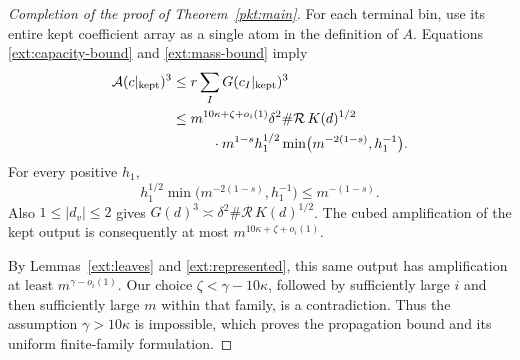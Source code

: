 \begin{proof}[Completion of the proof of Theorem~\ref{pkt:main}]
For each terminal bin, use its entire kept coefficient array
as a single atom in the definition of \(A\). Equations
\eqref{ext:capacity-bound} and \eqref{ext:mass-bound} imply
\begin{align*}
 \mathcal A(c|_{\mathrm{kept}})^3
 &\leq r\sum_I G(c_I|_{\mathrm{kept}})^3\\
 &\leq m^{10\kappa+\zeta+o_i(1)}
     \delta^2\#\mathcal R\,K(d)^{1/2}\\
 &\hspace{10mm}\cdot
   m^{1-s}h_1^{1/2}
      \min\bigl(m^{-2(1-s)},h_1^{-1}\bigr).
\end{align*}
For every positive \(h_1\),
\[
 h_1^{1/2}\min\bigl(m^{-2(1-s)},h_1^{-1}\bigr)
                      \leq m^{-(1-s)}.
\]
Also \(1\leq|d_v|\leq2\) gives
\(G(d)^3\asymp\delta^2\#\mathcal R\,K(d)^{1/2}\).
The cubed amplification of the kept output is consequently
at most \(m^{10\kappa+\zeta+o_i(1)}\).

By Lemmas~\ref{ext:leaves} and \ref{ext:represented}, this same
output has amplification at least \(m^{\gamma-o_i(1)}\).
Our choice \(\zeta<\gamma-10\kappa\), followed by sufficiently
large \(i\) and then sufficiently large \(m\) within that
family, is a contradiction. Thus the assumption
\(\gamma>10\kappa\) is impossible, which proves the propagation
bound and its uniform finite-family formulation.
\end{proof}
